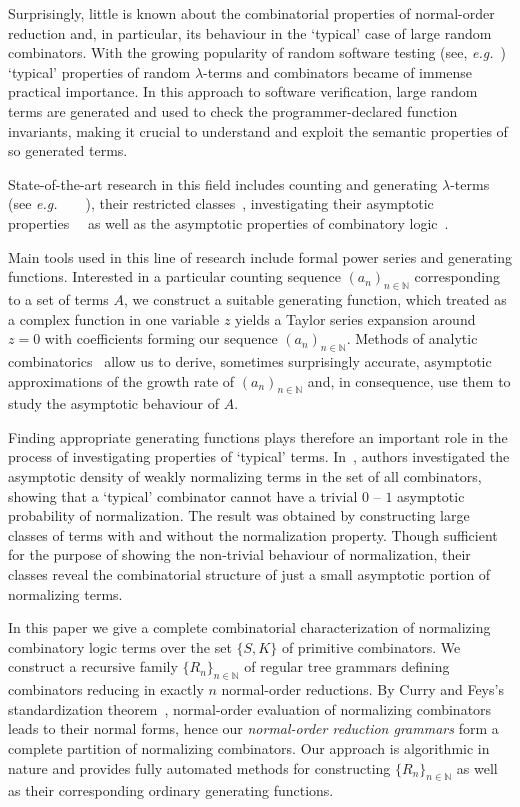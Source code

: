 \documentclass[11pt,a4paper]{amsart}
\newcommand\eg{\emph{e.g.}\ }
\theoremstyle{definition}
\begin{document}
Surprisingly, little is known about the combinatorial properties of normal-order reduction and, in particular, its behaviour in the `typical' case of large random combinators. With the growing popularity of random software testing (see, \eg \cite{DBLP:conf/icse/PalkaCRH11}) `typical' properties of random $\lambda$-terms and combinators became of immense practical importance. In this approach to software verification, large random terms are generated and used to check the programmer-declared function invariants, making it crucial to understand and exploit the semantic properties of so generated terms. 

State-of-the-art research in this field includes counting and generating $\lambda$-terms (see \eg~\cite{DBLP:journals/jfp/GrygielL13}~\cite{DBLP:journals/corr/Lescanne14}~\cite{DBLP:conf/stacs/GittenbergerG16}), their restricted classes~\cite{1510.01167}, investigating their asymptotic properties~\cite{lmcs:848}~\cite{Bendkowski2016} as well as the asymptotic properties of combinatory logic~\cite{Bendkowski2015}. 

Main tools used in this line of research include formal power series and generating functions. Interested in a particular counting sequence ${(a_n)}_{n \in \mathbb{N}}$ corresponding to a set of terms $A$, we construct a suitable generating function, which treated as a complex function in one variable $z$ yields a Taylor series expansion around $z=0$ with coefficients forming our sequence ${(a_n)}_{n \in \mathbb{N}}$. Methods of analytic combinatorics~\cite{Flajolet:2009:AC:1506267} allow us to derive, sometimes surprisingly accurate, asymptotic approximations of the growth rate of ${(a_n)}_{n \in \mathbb{N}}$ and, in consequence, use them to study the asymptotic behaviour of $A$. 

Finding appropriate generating functions plays therefore an important role in the process of investigating properties of `typical' terms. In~\cite{Bendkowski2015}, authors investigated the asymptotic density of weakly normalizing terms in the set of all combinators, showing that a `typical' combinator cannot have a trivial $0$ -- $1$ asymptotic probability of normalization. The result was obtained by constructing large classes of terms with and without the normalization property. Though sufficient for the purpose of showing the non-trivial behaviour of normalization, their classes reveal the combinatorial structure of just a small asymptotic portion of normalizing terms.

In this paper we give a complete combinatorial characterization of normalizing combinatory logic terms over the set $\{S, K\}$ of primitive combinators. We construct a recursive family ${\{R_n\}}_{n \in \mathbb{N}}$ of regular tree grammars defining combinators reducing in exactly $n$ normal-order reductions. By Curry and Feys's standardization theorem~\cite{curry-feys1958}, normal-order evaluation of normalizing combinators leads to their normal forms, hence our \emph{normal-order reduction grammars} form a complete partition of normalizing combinators. Our approach is algorithmic in nature and provides fully automated methods for constructing ${\{R_n\}}_{n \in \mathbb{N}}$ as well as their corresponding ordinary generating functions.
\end{document}
